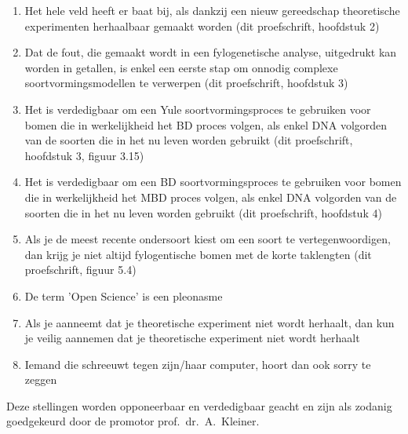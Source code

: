 \documentclass{propositions}
\begin{document}
{\begin{enumerate}
  \item Het hele veld heeft er baat bij, als dankzij een nieuw 
        gereedschap theoretische experimenten herhaalbaar gemaakt worden 
        (dit proefschrift, hoofdstuk 2)
  \item Dat de fout, die gemaakt wordt in een fylogenetische analyse,
        uitgedrukt kan worden in getallen, is enkel een eerste
        stap om onnodig complexe soortvormingsmodellen te verwerpen
        (dit proefschrift, hoofdstuk 3)
  \item Het is verdedigbaar om een Yule soortvormingsproces te gebruiken
        voor bomen die in werkelijkheid het BD proces volgen,
        als enkel DNA volgorden van de soorten die in het nu
        leven worden gebruikt 
        (dit proefschrift, hoofdstuk 3, figuur 3.15)
  \item Het is verdedigbaar om een BD soortvormingsproces te gebruiken
        voor bomen die in werkelijkheid het MBD proces volgen,
        als enkel DNA volgorden van de soorten die in het nu
        leven worden gebruikt (dit proefschrift, hoofdstuk 4)
  \item Als je de meest recente ondersoort kiest om een soort te 
        vertegenwoordigen, dan krijg je niet altijd fylogentische
        bomen met de korte taklengten (dit proefschrift, figuur 5.4)
  \item De term 'Open Science' is een pleonasme
  \item Als je aanneemt dat je theoretische experiment niet wordt herhaalt,
        dan kun je veilig aannemen dat je theoretische experiment niet wordt herhaalt
  \item Iemand die schreeuwt tegen zijn/haar computer, hoort dan ook sorry te zeggen
\end{enumerate}

\bigskip
\bigskip

\begin{center}
Deze stellingen worden opponeerbaar en verdedigbaar geacht en zijn als zodanig goedgekeurd door de promotor prof.\ dr.\ A.\ Kleiner.
\end{center}

}
\end{document}
